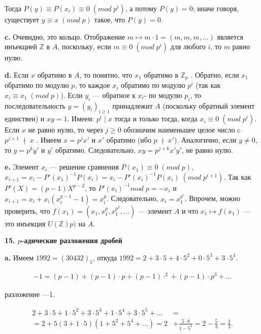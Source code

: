 \documentclass{mai_book}
\begin{document}
Тогда $P(y)\equiv P(x_i)\equiv 0\; (mod\; p^i)$, а потому $P(y)=0$; иначе говоря,
существует $y\equiv x\; (mod\; p)$ такое, что $P(y)=0$.

\medskip
\textbf{c.} Очевидно, это кольцо. Отображение $m\mapsto m\cdot 1=(m,m,m,\dots)$ является инъекцией $\mathbb{Z}$ в $A$, поскольку, если $m\equiv 0\; (mod\; p^i)$ для любого $i$,
то $m$ равно нулю.

\medskip
\textbf{d.} Если $x$ обратимо в $A$, то понятно, что $x_1$ обратимо в $\mathbb{Z}_p$
. Обратно, если $x_1$ обратимо по модулю $p$, то каждое $x_i$ обратимо по модулю
$p^i$ (так как $x_i\equiv x_1\; (mod\; p)$). Если $y_i$ --- обратное к $x_i$- по модулю $p_i$,
то последовательность $y=(y_i)_{i\geq 1}$ принадлежит $A$ (поскольку обрат­ный элемент единствен) и $xy=1$. Имеем: $p^i\; |\; x$ тогда и только тогда,
когда $x_i\equiv 0\; (mod\; p^i)$. Если $x$ не равно нулю, то через $j\geq 0$ обозначим
наименьшее целое число c $p^{j+1}\;\nmid \; x$  . Имеем $x=p^jx'$ и $x'$ обратимо (ибо $p\; \nmid \; x'$). Аналогично, если $y\neq 0$, то $y=p^ky'$ и $y'$
 обратимо. Следовательно, $xy=p^{j+k}x'y'$, не равно нулю.

\medskip
\textbf{e.} Элемент $x_i$ --- решение сравнения $P(x_1)\equiv 0\; (mod\; p)$,
$x_{i+1}=x_i-P'(x_1)^{-1}P(x_i)=x_i-P'(x_i)^{-1}P(x_i)\; (mod\; p^{i+1})$. Так как $P'(X)=(p-1)X^{p-2}$, то $P'(x_i)^{-1}mod\; p=-x_i$ и $x_{i+1}=x_i+x_i(x^{p-1}_i-1)=x^p_i$. Следовательно, $x_i=x^{p^i}_1$. Впрочем, можно проверить, что
$f(x_1)=(x_1,x^p_1,x^{p^2}_1,\dots)$ --- элемент $A$ и что $x_1\mapsto f(x_1)$ --- это инъекция $U(\mathbb{Z})p)$ на $A$.

\newpage


\textbf{15. $p$-адические разложения дробей}

\medskip
\textbf{a.} Имеем $1992=(30432)_5$, откуда $1992=2+3\cdot 5+4\cdot 5^2+0\cdot 5^3+3\cdot 5^4$.

$$
\begin{aligned}
-1=(p-1)+(p-1)\cdot p+(p-1)\cdotp^2+(p-1)\cdot p^3+\dots
\end{aligned}
$$

\medskip
\noindent разложение —1.

$$
\begin{aligned}
2+3\cdot 5+1\cdot 5^2+3\cdot 5^3+1\cdot 5^4+3\cdot 5^5+\dots &=\\
=2+5(3+1\cdot 5)(1+5^2+5^4+\dots)=2&+\frac{5\cdot 8}{1-5^2}= 2-\frac{5}{3}=\frac{1}{3}.
\end{aligned}
$$
\end{document}
